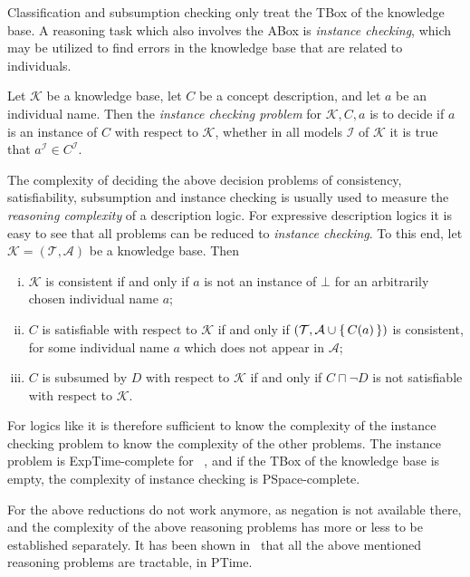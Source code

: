 Classification and subsumption checking only treat the TBox of the knowledge base.  A
reasoning task which also involves the ABox is \emph{instance checking}, which may be
utilized to find errors in the knowledge base that are related to individuals.

\begin{Definition}
  \label{def:instance-checking}
  Let $\mathcal{K}$ be a knowledge base, let $C$ be a concept description, and let $a$ be
  an individual name.  Then the \emph{instance checking problem} for $\mathcal{K}, C, a$
  is to decide if $a$ is an instance of $C$ with respect to $\mathcal{K}$, \ie whether in
  all models $\mathcal{I}$ of $\mathcal{K}$ it is true that $a^{\mathcal{I}} \in
  C^{\mathcal{I}}$.
\end{Definition}

The complexity of deciding the above decision problems of consistency, satisfiability,
subsumption and instance checking is usually used to measure the \emph{reasoning
  complexity} of a description logic.  For expressive description logics it is easy to see
that all problems can be reduced to \emph{instance checking}.  To this end, let
$\mathcal{K} = (\mathcal{T}, \mathcal{A})$ be a knowledge base.  Then
\begin{enumerate}[i. ]
\item $\mathcal{K}$ is consistent if and only if $a$ is not an instance of $\bot$ for an
  arbitrarily chosen individual name $a$;
\item $C$ is satisfiable with respect to $\mathcal{K}$ if and only if $(\mathcal{T},
  \mathcal{A} \cup {\ensuremath{\{\, C(a) \,\}}} )$ is consistent, for some individual name $a$ which does
  not appear in $\mathcal{A}$;
\item $C$ is subsumed by $D$ with respect to $\mathcal{K}$ if and only if $C \sqcap \neg
  D$ is not satisfiable with respect to $\mathcal{K}$.
\end{enumerate}
For logics like \ALC it is therefore sufficient to know the complexity of the instance
checking problem to know the complexity of the other problems.  The instance problem is
ExpTime-complete for \ALC~\cite{DLhandbook}, and if the TBox of the knowledge base is
empty, the complexity of instance checking is PSpace-complete.

For \ELbot the above reductions do not work anymore, as negation is not available there,
and the complexity of the above reasoning problems has more or less to be established
separately.  It has been shown in~\cite{DBLP:conf/ijcai/Baader03a,
  DBLP:conf/ecai/Brandt04, DBLP:conf/ijcai/BaaderBL05} that all the above mentioned
reasoning problems are tractable, \ie in PTime.

